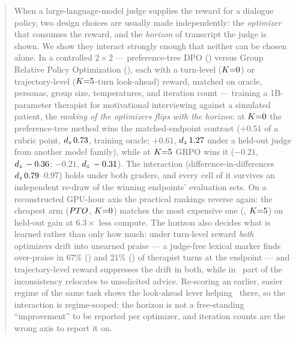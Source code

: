 \begin{abstract}
When a large-language-model judge supplies the reward for a dialogue policy, two design choices
are usually made independently: the \emph{optimizer} that consumes the reward, and the
\emph{horizon} of transcript the judge is shown. We show they interact strongly enough that
neither can be chosen alone. In a controlled $2 \times 2$ --- preference-tree DPO (\PTO) versus
Group Relative Policy Optimization (\GRPO), each with a turn-level ($\Kz$) or trajectory-level
($\Kf$-turn look-ahead) reward, matched on oracle, personas, group size, temperatures, and
iteration count --- training a 1B-parameter therapist for motivational interviewing against a
simulated patient, the \emph{ranking of the optimizers flips with the horizon}: at $\Kz$ the
preference-tree method wins the matched-endpoint contrast ($+0.51$ of a rubric point,
$\dz\,0.73$, training oracle; $+0.61$, $\dz\,1.27$ under a held-out judge from another model
family), while at $\Kf$ GRPO wins it ($-0.21$, $\dz\,-0.36$; $-0.21$, $\dz\,-0.31$). The
interaction (difference-in-differences $\dz\,0.79$--$0.97$) holds under both graders, and every
cell of it survives an independent re-draw of the winning endpoints' evaluation sets. On a
reconstructed GPU-hour axis the practical rankings reverse again: the cheapest arm ($\PTO$,
$\Kz$) matches the most expensive one (\GRPO, $\Kf$) on held-out gain at $6.3\times$ less
compute. The horizon also decides what is learned rather than only how much: under turn-level
reward \emph{both} optimizers drift into unearned praise --- a judge-free lexical marker finds
over-praise in $67\%$ (\GRPO) and $21\%$ (\PTO) of therapist turns at the endpoint --- and
trajectory-level reward suppresses the drift in both, while in \PTO\ part of the inconsistency
relocates to unsolicited advice. Re-scoring an earlier, easier regime of the same task shows the
look-ahead lever helping \PTO\ there, so the interaction is regime-scoped: the horizon is not a
free-standing ``improvement'' to be reported per optimizer, and iteration counts are the wrong
axis to report it on.
\end{abstract}

